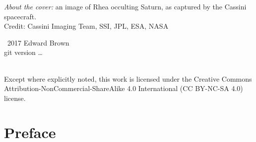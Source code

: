 
\maketitle
\newpage
\begin{fullwidth}
\thispagestyle{empty}

\vspace{3\baselineskip}
\noindent \emph{About the cover:} an image of Rhea occulting Saturn, as captured by the Cassini spacecraft.\\
\noindent Credit: Cassini Imaging Team, SSI, JPL, ESA, NASA

\vfill
\noindent \ccCopy\ 2017 Edward Brown\\
\noindent git version \ldots

\vspace{3\baselineskip}
\noindent \ccbyncsa \\
\noindent Except where explicitly noted, this work is licensed under the Creative Commons
Attribution-NonCommercial-ShareAlike 4.0 International (CC BY-NC-SA
4.0) license.

\end{fullwidth}
\newpage
\chapter*{Preface}


\tableofcontents
\listoffigures
\listofexercises
